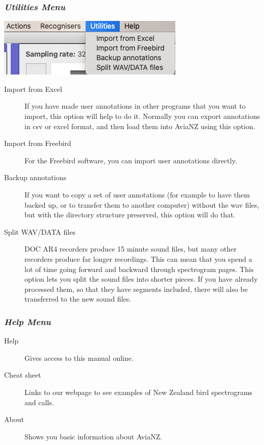 \documentclass{article}
\begin{document}
\subsubsection{{\em Utilities Menu} \label{sec:utilities}}

\begin{center}
\includegraphics[width=.3\textwidth]{Figures/UtilitiesMenu}
\end{center}

\begin{description}
\item [Import from Excel] If you have made user annotations in other programs that you want to import, this option will help to do it. Normally you can export annotations in csv or excel format, and then load them into AviaNZ using this option.
\item [Import from Freebird] For the Freebird software, you can import user annotations directly.
\item[Backup annotations] If you want to copy a set of user annotations (for example to have them backed up, or to transfer them to another computer) without the wav files, but with the directory structure preserved, this option will do that. 
\item[Split WAV/DATA files] DOC AR4 recorders produce 15 minute sound files, but many other recorders produce far longer recordings. This can mean that you spend a lot of time going forward and backward through spectrogram pages. This option lets you split the sound files into shorter pieces. If you have already processed them, so that they have segments included, there will also be transferred to the new sound files.
\end{description}

\subsubsection{{\em Help Menu}}

\begin{description}
\item [Help] Gives access to this manual online.
\item [Cheat sheet] Links to our webpage to see examples of New Zealand bird spectrograms and calls.
\item[About] Shows you basic information about AviaNZ.
\end{description}
\end{document}
